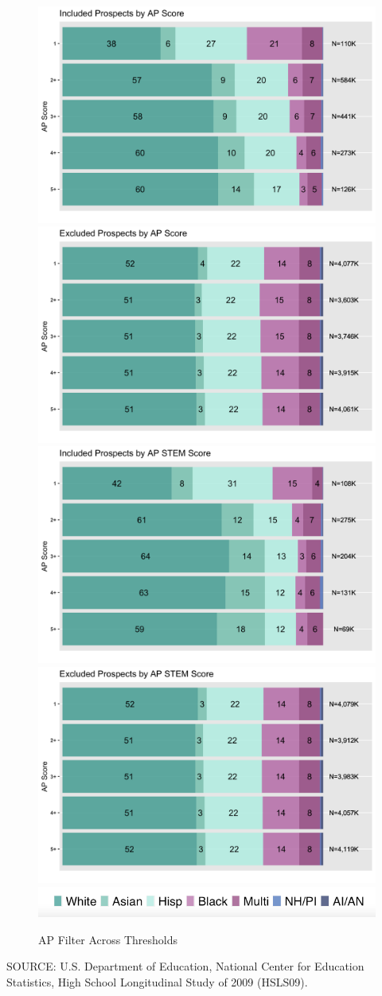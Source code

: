 \documentclass[
  12pt,
]{article}
\begin{document}
\begin{landscape}
\pagebreak



\begin{figure}

{\centering \includegraphics[width=0.37\linewidth]{./../../outputs/figures/p2_ap_incv2} \includegraphics[width=0.37\linewidth]{./../../outputs/figures/p2_ap_excv2} \includegraphics[width=0.37\linewidth]{./../../outputs/figures/p2_apstem_incv2} \includegraphics[width=0.37\linewidth]{./../../outputs/figures/p2_apstem_excv2} \includegraphics[width=0.37\linewidth]{./../../outputs/figures/legend_horizontal} 

}

\caption{AP Filter Across Thresholds}\label{fig:thresholds-tests-ap}
\end{figure}

\begingroup
\fontsize{8}{8}\selectfont
SOURCE: U.S. Department of Education, National Center for Education Statistics, High School Longitudinal Study of 2009 (HSLS09).
\endgroup

\pagebreak

\end{landscape}
\end{document}
